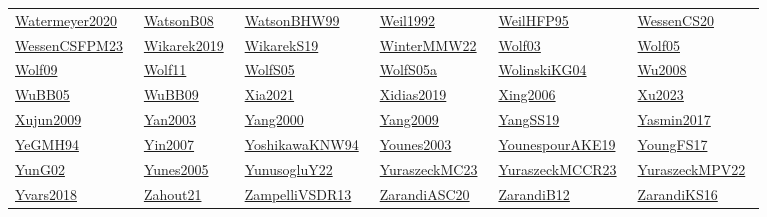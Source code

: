 \begin{longtable}{*{6}{l}}
\href{../}{Watermeyer2020}~\cite{Watermeyer2020} & \href{../works/WatsonB08.pdf}{WatsonB08}~\cite{WatsonB08} & \href{../works/WatsonBHW99.pdf}{WatsonBHW99}~\cite{WatsonBHW99} & \href{../}{Weil1992}~\cite{Weil1992} & \href{../works/WeilHFP95.pdf}{WeilHFP95}~\cite{WeilHFP95} & \href{../works/WessenCS20.pdf}{WessenCS20}~\cite{WessenCS20}\\ 
\href{../works/WessenCSFPM23.pdf}{WessenCSFPM23}~\cite{WessenCSFPM23} & \href{../}{Wikarek2019}~\cite{Wikarek2019} & \href{../works/WikarekS19.pdf}{WikarekS19}~\cite{WikarekS19} & \href{../works/WinterMMW22.pdf}{WinterMMW22}~\cite{WinterMMW22} & \href{../works/Wolf03.pdf}{Wolf03}~\cite{Wolf03} & \href{../works/Wolf05.pdf}{Wolf05}~\cite{Wolf05}\\ 
\href{../works/Wolf09.pdf}{Wolf09}~\cite{Wolf09} & \href{../works/Wolf11.pdf}{Wolf11}~\cite{Wolf11} & \href{../works/WolfS05.pdf}{WolfS05}~\cite{WolfS05} & \href{../works/WolfS05a.pdf}{WolfS05a}~\cite{WolfS05a} & \href{../works/WolinskiKG04.pdf}{WolinskiKG04}~\cite{WolinskiKG04} & \href{../}{Wu2008}~\cite{Wu2008}\\ 
\href{../works/WuBB05.pdf}{WuBB05}~\cite{WuBB05} & \href{../works/WuBB09.pdf}{WuBB09}~\cite{WuBB09} & \href{../}{Xia2021}~\cite{Xia2021} & \href{../}{Xidias2019}~\cite{Xidias2019} & \href{../}{Xing2006}~\cite{Xing2006} & \href{../}{Xu2023}~\cite{Xu2023}\\ 
\href{../}{Xujun2009}~\cite{Xujun2009} & \href{../}{Yan2003}~\cite{Yan2003} & \href{../}{Yang2000}~\cite{Yang2000} & \href{../}{Yang2009}~\cite{Yang2009} & \href{../works/YangSS19.pdf}{YangSS19}~\cite{YangSS19} & \href{../}{Yasmin2017}~\cite{Yasmin2017}\\ 
\href{../}{YeGMH94}~\cite{YeGMH94} & \href{../}{Yin2007}~\cite{Yin2007} & \href{../works/YoshikawaKNW94.pdf}{YoshikawaKNW94}~\cite{YoshikawaKNW94} & \href{../}{Younes2003}~\cite{Younes2003} & \href{../works/YounespourAKE19.pdf}{YounespourAKE19}~\cite{YounespourAKE19} & \href{../works/YoungFS17.pdf}{YoungFS17}~\cite{YoungFS17}\\ 
\href{../}{YunG02}~\cite{YunG02} & \href{../}{Yunes2005}~\cite{Yunes2005} & \href{../works/YunusogluY22.pdf}{YunusogluY22}~\cite{YunusogluY22} & \href{../works/YuraszeckMC23.pdf}{YuraszeckMC23}~\cite{YuraszeckMC23} & \href{../works/YuraszeckMCCR23.pdf}{YuraszeckMCCR23}~\cite{YuraszeckMCCR23} & \href{../works/YuraszeckMPV22.pdf}{YuraszeckMPV22}~\cite{YuraszeckMPV22}\\ 
\href{../}{Yvars2018}~\cite{Yvars2018} & \href{../works/Zahout21.pdf}{Zahout21}~\cite{Zahout21} & \href{../works/ZampelliVSDR13.pdf}{ZampelliVSDR13}~\cite{ZampelliVSDR13} & \href{../works/ZarandiASC20.pdf}{ZarandiASC20}~\cite{ZarandiASC20} & \href{../}{ZarandiB12}~\cite{ZarandiB12} & \href{../works/ZarandiKS16.pdf}{ZarandiKS16}~\cite{ZarandiKS16}\\ 

\end{longtable}
